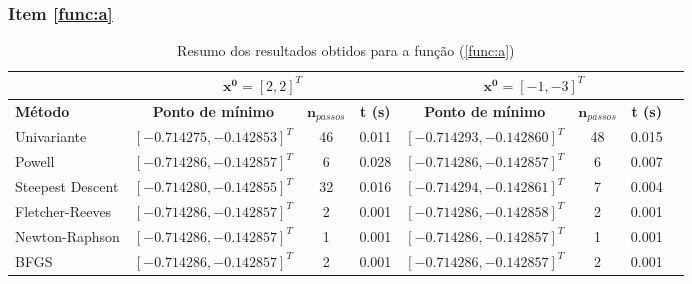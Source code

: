 \documentclass[10pt, a4paper]{article}
\begin{document}
\subsubsection{Item \ref{func:a}}

\begin{table}[htpb]
  \centering
  \begin{tabular}{|l|c|c|c|c|c|c|c|}
    \multicolumn{1}{c}{} %
    & 
    \multicolumn{3}{c}{$\mathbf{x^0} = [2, 2]^T$} \vline
    & 
    \multicolumn{3}{c}{$\mathbf{x^0} = [-1, -3]^T$} \\%
    \hline%
    \textbf{Método}
    &
    \textbf{Ponto de mínimo}
    & 
    $\mathbf{n}_{passos}$
    & 
    \textbf{t (s)}
    &
    \textbf{Ponto de mínimo}
    & 
    $\mathbf{n}_{passos}$
    & 
    \textbf{t (s)}
    \\
    Univariante        & $[-0.714275, -0.142853]^T$ & 46  & 0.011 &  $[-0.714293, -0.142860]^T$ &  48 &  0.015      \\
    Powell             & $[-0.714286, -0.142857]^T$ & 6   & 0.028 &  $[-0.714286, -0.142857]^T$ &  6  &  0.007      \\
    Steepest Descent   & $[-0.714280, -0.142855]^T$ & 32  & 0.016 &  $[-0.714294, -0.142861]^T$ &  7  &  0.004      \\
    Fletcher-Reeves    & $[-0.714286, -0.142857]^T$ & 2   & 0.001 &  $[-0.714286, -0.142858]^T$ &  2  &  0.001      \\
    Newton-Raphson     & $[-0.714286, -0.142857]^T$ & 1   & 0.001 &  $[-0.714286, -0.142857]^T$ &  1  &  0.001      \\
    BFGS               & $[-0.714286, -0.142857]^T$ & 2   & 0.001 &  $[-0.714286, -0.142857]^T$ &  2  &  0.001      \\
    \hline
  \end{tabular}
  \caption{Resumo dos resultados obtidos para a função (\ref{func:a})}
  \label{tab:q1a_results}
\end{table}
\end{document}
